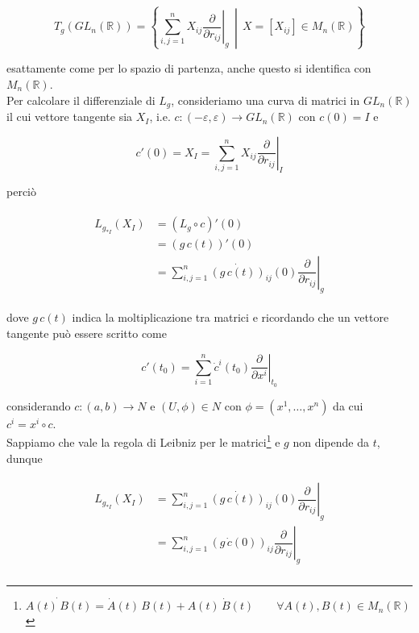 \begin{equation}
	T_{g}(GL_{n}(\mathbb{R})) = \left\{ \sum_{i,j=1}^{n} X_{ij} \left. \dfrac{\partial}{\partial r_{ij}} \right|_{g} \, \middle| \, X=[X_{ij}] \in M_{n}(\mathbb{R}) \right\}
\end{equation}

esattamente come per lo spazio di partenza, anche questo si identifica con $ M_{n}(\mathbb{R}) $.\\
Per calcolare il differenziale di $ L_{g} $, consideriamo una curva di matrici in $ GL_{n}(\mathbb{R}) $ il cui vettore tangente sia $ X_{I} $, i.e. $ c : (-\varepsilon,\varepsilon) \to GL_{n}(\mathbb{R}) $ con $ c(0)=I $ e 

\begin{equation}
	c'(0) = X_{I} = \sum_{i,j=1}^{n} X_{ij} \left. \dfrac{\partial}{\partial r_{ij}} \right|_{I}
\end{equation}

perciò

\begin{align}
	\begin{split}
		L_{g_{*I}}(X_{I}) &= (L_{g} \circ c)'(0)\\
		&= (g \, c(t))'(0)\\
		&= \sum_{i,j=1}^{n} \dot{(g \, c(t))}_{ij}(0) \left. \dfrac{\partial}{\partial r_{ij}} \right|_{g}
	\end{split}
\end{align}

dove $ g \, c(t) $ indica la moltiplicazione tra matrici e ricordando che un vettore tangente può essere scritto come

\begin{equation}
	c'(t_{0}) = \sum_{i=1}^{n} \dot{c}^{i}(t_{0}) \left. \dfrac{\partial}{\partial x^{i}} \right|_{t_{0}}
\end{equation}

considerando $ c : (a,b) \to N $ e $ (U,\phi) \in N $ con $ \phi=(x^{1},\dots,x^{n}) $ da cui $ c^{i} = x^{i} \circ c $.\\
Sappiamo che vale la regola di Leibniz per le matrici\footnote{%
	$ \dot{A(t) \, B(t)} = \dot{A}(t) \, B(t) + A(t) \, \dot{B}(t) \qquad \forall A(t),B(t) \in M_{n}(\mathbb{R}) $%
} e $ g $ non dipende da $ t $, dunque

\begin{align}
	\begin{split}
		L_{g_{*I}}(X_{I}) &= \sum_{i,j=1}^{n} \dot{(g \, c(t))}_{ij}(0) \left. \dfrac{\partial}{\partial r_{ij}} \right|_{g}\\
		&= \sum_{i,j=1}^{n} (g \, \dot{c}(0))_{ij} \left. \dfrac{\partial}{\partial r_{ij}} \right|_{g}\\
	\end{split}
\end{align}

